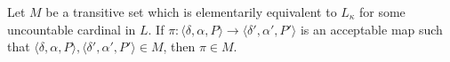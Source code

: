 Let $M$ be a transitive set which is elementarily equivalent to $L_\kappa$ for some uncountable cardinal in $L$. If $\pi: \langle \delta, \alpha, P \rangle \rightarrow \langle \delta', \alpha', P' \rangle$ is an acceptable map such that $\langle \delta, \alpha, P \rangle, \langle \delta', \alpha', P' \rangle \in M$, then $\pi \in M$.
